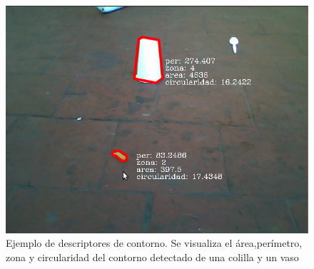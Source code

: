 \begin{figure}[tpb]
\begin{center}
  \includegraphics[scale=0.4]{figuras/filtros.png}
\end{center}
  \caption{\small Ejemplo de descriptores de contorno. Se visualiza el área,perímetro, zona y circularidad del contorno 
  detectado de una colilla y un vaso}
  \label{fig:erode}
\end{figure}

